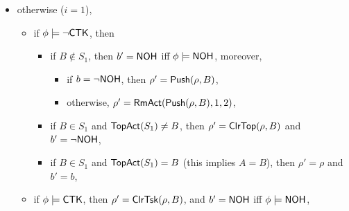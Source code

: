 {\begin{itemize}
\begin{itemize}
\begin{itemize}
\begin{itemize}
				\begin{itemize}
						\item if $b = \neg \nohflag$, then $\rho'=\clrtsk(\mvtsktop(\rho, i), B)$, 
						\item otherwise,  $\rho'= \rmact(\clrtsk(\mvtsktop(\rho, i), B), 2, 1)$, 
				\end{itemize}
        			\end{itemize}
		\item otherwise ($i = 1$), 
        			\begin{itemize}
            			\item if $\phi \models \neg {\sf CTK}$, then 
            			\begin{itemize}
					\item if $B \not \in S_1$, then $b' = {\sf NOH}$ iff $\phi  \models {\sf NOH}$, moreover, 
					\begin{itemize}
						\item if $b = \neg \nohflag$, then $\rho'=\mathsf{Push}(\rho, B)$,
						\item otherwise, $\rho' = \mathsf{RmAct}(\mathsf{Push}(\rho, B), 1, 2)$,  
					\end{itemize}
            				\item if $B \in S_1$ and $\mathsf{TopAct}(S_1) \neq B$, then $\rho'= \mathsf{ClrTop}(\rho, B)$ and $b' = \neg{\sf NOH}$,
					\item if $B \in S_1$ and $\mathsf{TopAct}(S_1) = B$ (this implies $A = B$), then $\rho' = \rho$ and $b' = b$,
			 	\end{itemize}
            			\item if $\phi \models {\sf CTK}$, then $\rho'= \mathsf{ClrTsk}(\rho, B)$, and $b' = {\sf NOH}$ iff $\phi  \models {\sf NOH}$, 

\end{itemize}
\end{itemize}
\end{itemize}
\end{itemize}}
